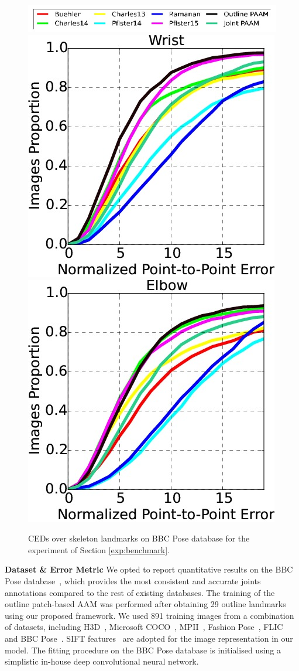 \begin{figure}[b!]
    \vspace{-5pt}
    \centering
    \includegraphics[width=\columnwidth]{resources/Annotation_Correction/HandBenchmark/legend}
    \\
    \includegraphics[width=0.48\columnwidth]{resources/Annotation_Correction/HandBenchmark/wrist}
    \includegraphics[width=0.48\columnwidth]{resources/Annotation_Correction/HandBenchmark/elbow}
    \caption{CEDs over skeleton landmarks on BBC Pose database for the experiment of Section  \ref{exp:benchmark}.}
    \label{fig:hand_benchmark}
\end{figure}


\noindent\textbf{Dataset \& Error Metric} We opted to report quantitative results on the BBC Pose database~\cite{pfister2015flowing}, which provides the most consistent and accurate joints annotations compared to the rest of existing databases. The training of the outline patch-based AAM was performed after obtaining 29 outline landmarks using our proposed framework. We used 891 training images from a combination of datasets, including H3D~\cite{PoseletsICCV09}, Microsoft COCO~\cite{lin2014microsoft}, MPII~\cite{andriluka14cvpr}, Fashion Pose~\cite{dantone2013human}, FLIC~\cite{sapp2013modec} and BBC Pose~\cite{pfister2015flowing}. SIFT features~\cite{PoseletsICCV09} are adopted for the image representation in our model. The fitting procedure on the BBC Pose database is initialised using a simplistic in-house deep convolutional neural network.

